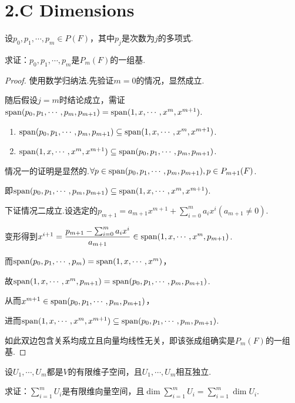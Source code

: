 \section{2.C Dimensions}

\begin{problem}[10]\label{2.C.10}
    设\(p_0,p_1,\cdots,p_m\in P(F)\)，其中\(p_j\)是次数为\(j\)的多项式.

    求证：\(p_0,p_1,\cdots,p_m\)是\(P_m(F)\)的一组基.
\end{problem}

\begin{proof}
    使用数学归纳法.先验证\(m=0\)的情况，显然成立.

    随后假设\(j=m\)时结论成立，需证\(\operatorname{span} (p_0,p_1,\cdots,p_m,p_{m+1})=\operatorname{span} (1,x,\cdots,x^m,x^{m+1})\).

    \begin{enumerate}
        \item \(\operatorname{span} (p_0,p_1,\cdots,p_m,p_{m+1}) \subseteq \operatorname{span} (1,x,\cdots,x^m,x^{m+1})\).
        \item \(\operatorname{span} (1,x,\cdots,x^m,x^{m+1}) \subseteq \operatorname{span} (p_0,p_1,\cdots,p_m,p_{m+1})\).
    \end{enumerate}
    
    情况一的证明是显然的.\(\forall p\in \operatorname{span} (p_0,p_1,\cdots,p_m,p_{m+1}),p\in P_{m+1}(F)\).
    
    即\(\operatorname{span} (p_0,p_1,\cdots,p_m,p_{m+1})\subseteq \operatorname{span} (1,x,\cdots,x^m,x^{m+1})\).
    
    下证情况二成立.设选定的\(p_{m+1}=a_{m+1}x^{m+1}+\sum_{i=0}^m a_ix^i(a_{m+1} \ne 0)\).
    
    变形得到\(x^{i+1}=\dfrac{p_{m+1}-\sum_{i=0}^m a_ix^i}{a_{m+1}} \in \operatorname{span} (1,x,\cdots,x^m,p_{m+1})\).
    
    而\(\operatorname{span} (p_0,p_1,\cdots,p_m)=\operatorname{span} (1,x,\cdots,x^m)\)，
    
    故\(\operatorname{span} (1,x,\cdots,x^m,p_{m+1})=\operatorname{span} (p_0,p_1,\cdots,p_m,p_{m+1})\).
    
    从而\(x^{m+1}\in \operatorname{span} (p_0,p_1,\cdots,p_m,p_{m+1})\)，
    
    进而\(\operatorname{span} (1,x,\cdots,x^m,x^{m+1}) \subseteq \operatorname{span} (p_0,p_1,\cdots,p_m,p_{m+1})\).
    
    如此双边包含关系均成立且向量均线性无关，即该张成组确实是\(P_m(F)\)的一组基.    
\end{proof}

\begin{problem}[14]\label{2.C.14}
    设\(U_1,\cdots,U_m\)都是\(V\)的有限维子空间，且\(U_1,\cdots,U_m\)相互独立.

    求证：\(\sum_{i=1}^m U_i\)是有限维向量空间，且\(\dim \sum_{i=1}^m U_i=\sum_{i=1}^m \dim U_i\).
\end{problem}

